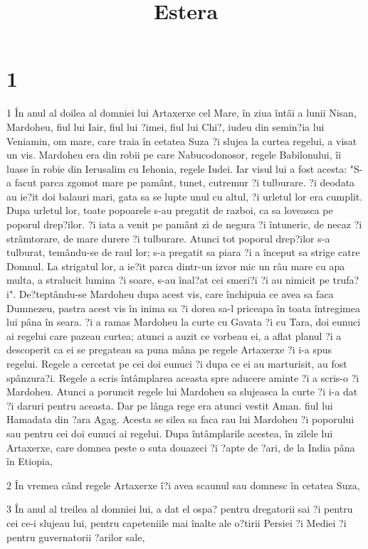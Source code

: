 

\title{Estera}


\chapter{1}

\par 1 În anul al doilea al domniei lui Artaxerxe cel Mare, în ziua întâi a lunii Nisan, Mardoheu, fiul lui Iair, fiul lui ?imei, fiul lui Chi?, iudeu din semin?ia lui Veniamin, om mare, care traia în cetatea Suza ?i slujea la curtea regelui, a visat un vis. Mardoheu era din robii pe care Nabucodonosor, regele Babilonului, îi luase în robie din Ierusalim cu Iehonia, regele Iudei. Iar visul lui a fost acesta: "S-a facut parca zgomot mare pe pamânt, tunet, cutremur ?i tulburare. ?i deodata au ie?it doi balauri mari, gata sa se lupte unul cu altul, ?i urletul lor era cumplit. Dupa urletul lor, toate popoarele s-au pregatit de razboi, ca sa loveasca pe poporul drep?ilor. ?i iata a venit pe pamânt zi de negura ?i întuneric, de necaz ?i strâmtorare, de mare durere ?i tulburare. Atunci tot poporul drep?ilor s-a tulburat, temându-se de raul lor; s-a pregatit sa piara ?i a început sa strige catre Domnul. La strigatul lor, a ie?it parca dintr-un izvor mic un râu mare cu apa multa, a stralucit lumina ?i soare, s-au înal?at cei smeri?i ?i au nimicit pe trufa?i". De?teptându-se Mardoheu dupa acest vis, care închipuia ce avea sa faca Dumnezeu, pastra acest vis în inima sa ?i dorea sa-l priceapa în toata întregimea lui pâna în seara. ?i a ramas Mardoheu la curte cu Gavata ?i cu Tara, doi eunuci ai regelui care pazeau curtea; atunci a auzit ce vorbeau ei, a aflat planul ?i a descoperit ca ei se pregateau sa puna mâna pe regele Artaxerxe ?i i-a spus regelui. Regele a cercetat pe cei doi eunuci ?i dupa ce ei au marturisit, au fost spânzura?i. Regele a scris întâmplarea aceasta spre aducere aminte ?i a scris-o ?i Mardoheu. Atunci a poruncit regele lui Mardoheu sa slujeasca la curte ?i i-a dat ?i daruri pentru aceasta. Dar pe lânga rege era atunci vestit Aman. fiul lui Hamadata din ?ara Agag. Acesta se silea sa faca rau lui Mardoheu ?i poporului sau pentru cei doi eunuci ai regelui. Dupa întâmplarile acestea, în zilele lui Artaxerxe, care domnea peste o suta douazeci ?i ?apte de ?ari, de la India pâna în Etiopia,
\par 2 În vremea când regele Artaxerxe î?i avea scaunul sau domnesc în cetatea Suza,
\par 3 În anul al treilea al domniei lui, a dat el ospa? pentru dregatorii sai ?i pentru cei ce-i slujeau lui, pentru capeteniile mai înalte ale o?tirii Persiei ?i Mediei ?i pentru guvernatorii ?arilor sale,
